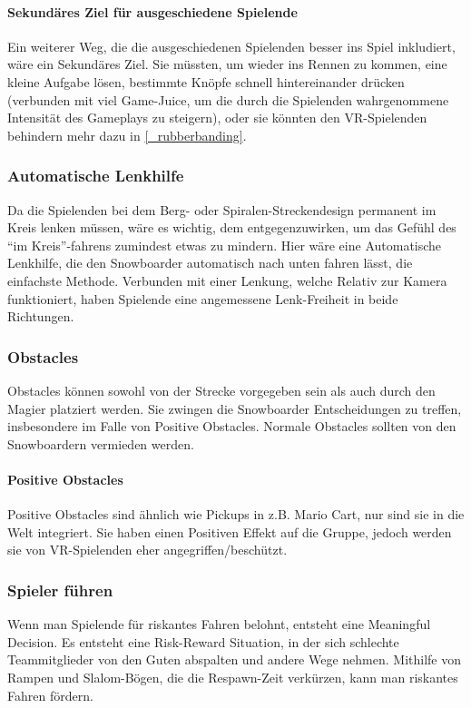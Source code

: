 \paragraph{Sekundäres Ziel für ausgeschiedene Spielende}
Ein weiterer Weg, die die ausgeschiedenen Spielenden besser ins Spiel inkludiert, wäre ein Sekundäres Ziel. Sie müssten, um wieder ins Rennen zu kommen, eine kleine Aufgabe lösen, bestimmte Knöpfe schnell hintereinander drücken (verbunden mit viel Game-Juice, um die durch die Spielenden wahrgenommene Intensität des Gameplays zu steigern), oder sie könnten den VR-Spielenden behindern mehr dazu in \ref{_rubberbanding}.

\subsubsection{Automatische Lenkhilfe}
Da die Spielenden bei dem Berg- oder Spiralen-Streckendesign permanent im Kreis lenken müssen, wäre es wichtig, dem entgegenzuwirken, um das Gefühl des "`im Kreis"'-fahrens zumindest etwas zu mindern. Hier wäre eine Automatische Lenkhilfe, die den Snowboarder automatisch nach unten fahren lässt, die einfachste Methode. Verbunden mit einer Lenkung, welche Relativ zur Kamera funktioniert, haben Spielende eine angemessene Lenk-Freiheit in beide Richtungen.

\subsubsection{Obstacles}
Obstacles können sowohl von der Strecke vorgegeben sein als auch durch den Magier platziert werden. Sie zwingen die Snowboarder Entscheidungen zu treffen, insbesondere im Falle von Positive Obstacles. Normale Obstacles sollten von den Snowboardern vermieden werden.

\paragraph{Positive Obstacles}
Positive Obstacles sind ähnlich wie Pickups in z.B. Mario Cart, nur sind sie in die Welt integriert. Sie haben einen Positiven Effekt auf die Gruppe, jedoch werden sie von VR-Spielenden eher angegriffen/beschützt.

\subsubsection{Spieler führen}
Wenn man Spielende für riskantes Fahren belohnt, entsteht eine Meaningful Decision. Es entsteht eine Risk-Reward Situation, in der sich schlechte Teammitglieder von den Guten abspalten und andere Wege nehmen. Mithilfe von Rampen und Slalom-Bögen, die die Respawn-Zeit verkürzen, kann man riskantes Fahren fördern.

